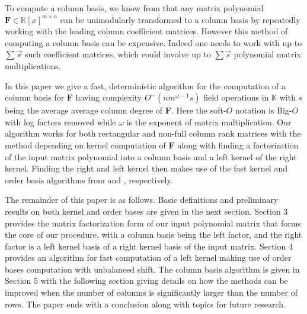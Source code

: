 To compute a column basis, we know from \cite{BL1997} that any matrix
polynomial $\mathbf{F}\in\mathbb{K}\left[x\right]^{m\times n}$ can
be unimodularly transformed to a column basis by repeatedly working
with the leading column coefficient matrices. However this method
of computing a column basis can be expensive. Indeed one needs to
work with up to $\sum\vec{s}$ such coefficient matrices, which could
involve up to $\sum\vec{s}$ polynomial matrix multiplications.

In this paper we give a fast, deterministic algorithm for the computation
of a column basis for $\mathbf{F}$ having complexity $O^{\sim}\left(nm^{\omega-1}s\right)$
field operations in $\mathbb{K}$ with $s$ being the average average
column degree of $\mathbf{F}$. Here the soft-$O$ notation is Big-$O$
with log factors removed while $\omega$ is the exponent of matrix
multiplication. Our algorithm works for both rectangular and non-full
column rank matrices with the method depending on kernel computation
of $\mathbf{F}$ along with finding a factorization of the input matrix
polynomial into a column basis and a left kernel of the right kernel.
Finding the right and left kernel then makes use of the fast kernel
and order basis algorithms from \cite{za2012} and \cite{za2009},
respectively.

The remainder of this paper is as follows. Basic definitions and preliminary
results on both kernel and order bases are given in the next section.
Section 3 provides the matrix factorization form of our input polynomial
matrix that forms the core of our procedure, with a column basis being
the left factor, and the right factor is a left kernel basis of a
right kernel basis of the input matrix. Section 4 provides an algorithm
for fast computation of a left kernel making use of order bases computation
with unbalanced shift. The column basis algorithm is given in Section
5 with the following section giving details on how the methods can
be improved when the number of columns is significantly larger than
the number of rows.  The paper ends with a conclusion along with
topics for future research.
